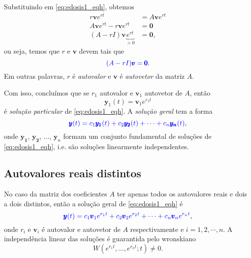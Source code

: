 Substituindo em \eqref{eq:edosis1_eqh}, obtemos
\begin{align}
  r\pmb{v}e^{rt} &= A\pmb{v}e^{rt} \\
  A\pmb{v}e^{rt} - r\pmb{v}e^{rt} &= \pmb{0} \\
  (A - rI)\pmb{v}\underbrace{e^{rt}}_{>0} &= \pmb{0},
\end{align}
ou seja, temos que $r$ e $\pmb{v}$ devem tais que
\begin{equation}\label{eq:edosis1_eqc}
  {\color{blue}(A - rI)\pmb{v} = \pmb{0}}.
\end{equation}
Em outras palavras, $r$ é \emph{autovalor} e $\pmb{v}$ é \emph{autovetor} da matriz $A$.

Com isso, concluímos que se $r_1$ autovalor e $\pmb{v}_1$ autovetor de $A$, então
\begin{equation}
  \pmb{y}_1(t) = \pmb{v}_1e^{r_1t}
\end{equation}
é \emph{solução particular} de \eqref{eq:edosis1_eqh}. A \emph{solução geral} tem a forma
\begin{equation}
  {\color{blue}\pmb{y}(t) = c_1\pmb{y_1}(t) + c_2\pmb{y_2}(t) + \cdots + c_n\pmb{y_n}(t)},
\end{equation}
onde $\pmb{y_1}$, $\pmb{y_2}$, $\dotsc$, $\pmb{y}_n$ formam um conjunto fundamental de soluções de \eqref{eq:edosis1_eqh}, i.e. são soluções linearmente independentes.

\subsection{Autovalores reais distintos}

No caso da matriz dos coeficientes $A$ ter apenas todos os autovalores reais e dois a dois distintos, então a solução geral de \eqref{eq:edosis1_eqh} é
\begin{equation}
  {\color{blue}\pmb{y}(t) = c_1\pmb{v}_1e^{r_1t}+c_2\pmb{v}_2e^{r_2t}+\cdots + c_n\pmb{v}_ne^{r_nt}},
\end{equation}
onde $r_i$ e $\pmb{v}_i$ é autovalor e autovetor de $A$ respectivamente e $i=1, 2, \cdots, n$. A independência linear das soluções é guarantida pelo wronskiano
\begin{equation}
  W(e^{r_1t}, \dotsc, e^{r_nt};t)\neq 0.
\end{equation}

